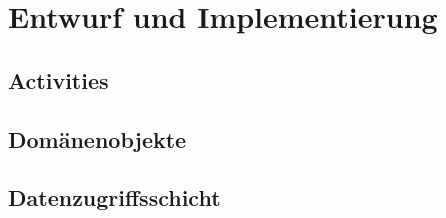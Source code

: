 
\section{Entwurf und Implementierung}

\subsection{Activities}

\subsection{Domänenobjekte}

\subsection{Datenzugriffsschicht}

